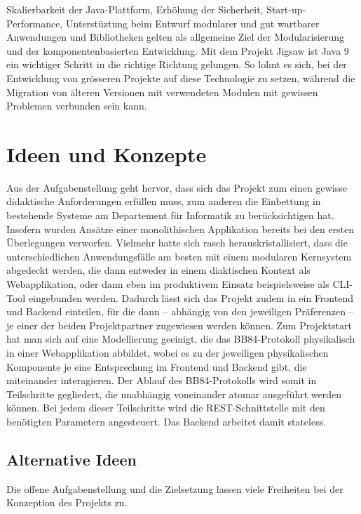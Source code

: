 \documentclass[a4paper,10.2pt,pdftex]{scrartcl}%
\begin{document}
Skalierbarkeit der Java-Plattform, Erhöhung der Sicherheit, Start-up-Performance, Unterstüztung beim Entwurf modularer und gut wartbarer Anwendungen und Bibliotheken gelten als allgemeine Ziel der Modularisierung und der komponentenbasierten Entwicklung. Mit dem Projekt Jigsaw ist Java 9 ein wichtiger Schritt in die richtige Richtung gelungen. So lohnt es sich, bei der Entwicklung von grösseren Projekte auf diese Technologie zu setzen, während die Migration von älteren Versionen mit verwendeten Modulen mit gewissen Problemen verbunden sein kann\cite[Kap. 15.4.2]{inden}. 


\section{Ideen und Konzepte}
Aus der Aufgabenstellung geht hervor, dass sich das Projekt zum einen gewisse didaktische Anforderungen erfüllen muss, zum anderen die Einbettung in bestehende Systeme am Departement für Informatik zu berücksichtigen hat. Insofern wurden Ansätze einer monolithischen Applikation bereits bei den ersten Überlegungen verworfen. Vielmehr hatte sich rasch herauskristallisiert, dass die unterschiedlichen Anwendungsfälle am besten mit einem modularen Kernsystem abgedeckt werden, die dann entweder in einem diaktischen Kontext als Webapplikation, oder dann eben im produktivem Einsatz beispielsweise als CLI-Tool eingebunden werden. Dadurch lässt sich das Projekt zudem in ein Frontend und Backend einteilen, für die dann -- abhängig von den jeweiligen Präferenzen --  je einer der beiden Projektpartner zugewiesen werden können. Zum Projektstart hat man sich auf eine Modellierung geeinigt, die das BB84-Protokoll physikalisch in einer Webapplikation abbildet, wobei es zu der jeweiligen physikalischen Komponente je eine Entsprechung im Frontend und Backend gibt, die miteinander interagieren. Der Ablauf des BB84-Protokolls wird somit in Teilschritte gegliedert, die unabhängig voneinander atomar ausgeführt werden können. Bei jedem dieser Teilschritte wird die REST-Schnittstelle mit den benötigten Parametern angesteuert. Das Backend arbeitet damit stateless. 

\subsection{Alternative Ideen}
Die offene Aufgabenstellung und die Zielsetzung lassen viele Freiheiten bei der Konzeption des Projekts zu.
\end{document}
